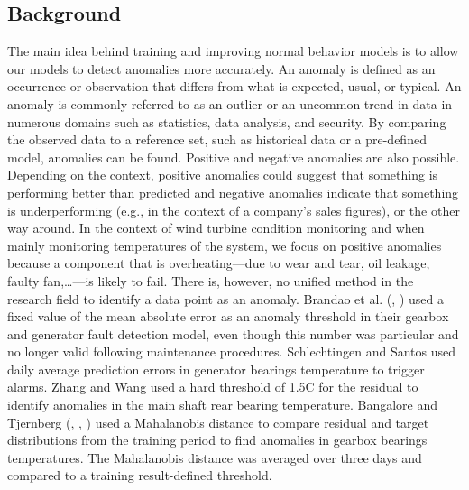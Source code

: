   \subsection{Background}
    The main idea behind training and improving normal behavior models is to allow our models to detect anomalies more accurately.
    An anomaly is defined as an occurrence or observation that differs from what is expected, usual, or typical. 
    An anomaly is commonly referred to as an outlier or an uncommon trend in data in numerous domains such as statistics, data analysis, and security.
    By comparing the observed data to a reference set, such as historical data or a pre-defined model, anomalies can be found.
    Positive and negative anomalies are also possible. Depending on the context, positive anomalies could suggest that something is performing better than predicted and 
    negative anomalies indicate that something is underperforming (e.g., in the context of a company's sales figures), or the other way around. In the context of wind
    turbine condition monitoring and when mainly monitoring temperatures of the system, we focus on positive anomalies because a component that is 
    overheating---due to wear and tear, oil leakage, faulty fan,\dots---is likely to fail. There is, however, no unified method in the research field to identify a data point 
    as an anomaly. Brandao et al. (\cite{Brandao_1}, \cite{Brandao_2}) used a fixed value of the mean absolute error as an anomaly threshold in their 
    gearbox and generator fault detection model, even though this number was particular and no longer valid following maintenance procedures. 
    Schlechtingen and Santos \cite{Schlechtingen} used daily average prediction errors in generator bearings temperature to trigger alarms. 
    Zhang and Wang \cite{Zhang_Wang} used a hard threshold of 1.5\degree C for the residual to identify anomalies in the main shaft rear bearing temperature.
    Bangalore and Tjernberg (\cite{Bangalore_1}, \cite{Bangalore_2}, \cite{Bangalore_3}) used a Mahalanobis distance to compare residual and target distributions from 
    the training period to find anomalies in gearbox bearings temperatures. The Mahalanobis distance was averaged over three days and compared to a training result-defined threshold.

